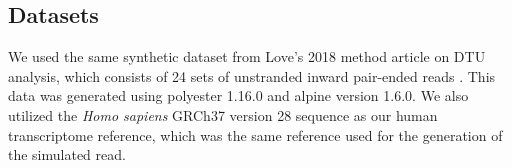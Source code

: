 \subsection{Datasets}

We used the same synthetic dataset from Love’s 2018 method article on DTU analysis, 
which consists of 24 sets of unstranded inward pair-ended reads \cite{love_swimming_2018}. 
This data was generated using polyester 1.16.0 and alpine version 1.6.0. \cite{frazee2015polyester} 
We also utilized the \textit{Homo sapiens} GRCh37 version 28 sequence as our 
human transcriptome reference, which was the same reference used for the generation 
of the simulated read. \cite{noauthor_homo_sapiens_nodate}

